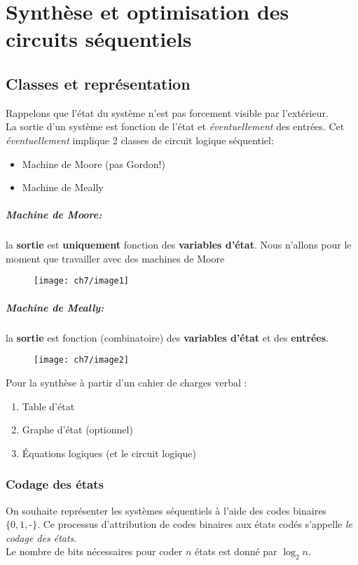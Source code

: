 \chapter{Synthèse et optimisation des circuits séquentiels}
\section{Classes et représentation}
Rappelons que l'état du système n'est pas forcement visible par l'extérieur.\\
La sortie d'un système est fonction de l'état et \textit{éventuellement} des entrées. Cet \textit{éventuellement} implique 2 classes de circuit logique séquentiel:
\begin{itemize}
	\item Machine de Moore (pas Gordon!)
	\item Machine de Meally
\end{itemize}
\paragraph{Machine de Moore:}
la \textbf{sortie} est \textbf{uniquement} fonction des \textbf{variables d'état}. Nous n'allons pour le moment que travailler avec des machines de Moore
\begin{figure}[H]
	\centering
	\texttt{[image: ch7/image1]}
\end{figure}
\paragraph{Machine de Meally:}
la \textbf{sortie} est fonction (combinatoire) des \textbf{variables d'état} et des \textbf{entrées}.
\begin{figure}[H]
	\centering
	\texttt{[image: ch7/image2]}
\end{figure}

Pour la synthèse à partir d'un cahier de charges verbal :
\begin{enumerate}
	\item Table d'état
	\item Graphe d'état (optionnel)
	\item Équations logiques (et le circuit logique)
\end{enumerate}
\subsection{Codage des états}
On souhaite représenter les systèmes séquentiels à l'aide des codes binaires $\{0, 1, \text{-}\}$. Ce processus d'attribution de codes binaires aux états codés s'appelle \textit{le codage des états}.\\
Le nombre de bits nécessaires pour coder $n$ états est donné par $\log_2n$.
